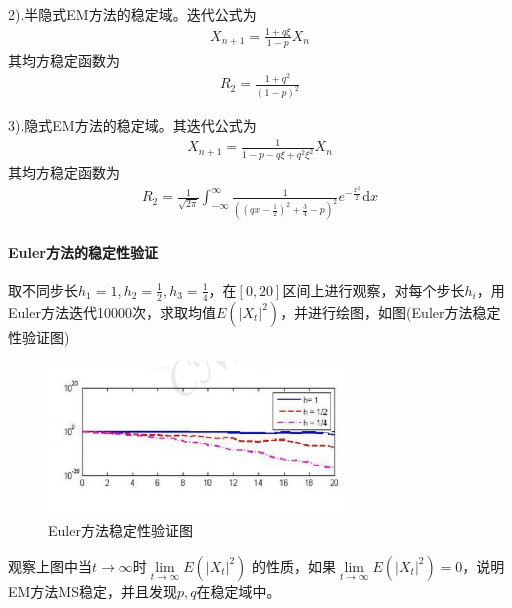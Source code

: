             \par
            2).半隐式EM方法的稳定域。迭代公式为
            \begin{align*}
            X_{n+1}=\frac{1+q\xi}{1-p}X_n
            \end{align*}
            其均方稳定函数为
            \begin{align*}
            R_2 = \frac{1+q^2}{(1-p)^2}
            \end{align*}
            \par
            3).隐式EM方法的稳定域。其迭代公式为
            \begin{align*}
            X_{n+1} = \frac{1}{1-p-q\xi + q^2 \xi^2} X_n
            \end{align*}
            其均方稳定函数为
            \begin{align*}
            R_2 = \frac{1}{\sqrt{2\pi}}\int_{- \infty}^{\infty}\frac{1}{( ( qx - \frac 12 )^2 +\frac {3}{4} - p )^2 } e^{-\frac{x^2}{2}}\mathrm{d}x
            \end{align*}

            \paragraph{Euler方法的稳定性验证}
            取不同步长$h_1 = 1,h_2 = \frac 12,h_3 = \frac 14$，在$[0,20]$区间上进行观察，对每个步长$h_i$，用Euler方法迭代10000次，求取均值$E(|X_t|^2)$，并进行绘图，如图(Euler方法稳定性验证图)
           \begin{figure}[H]
           \centering
           \includegraphics[width=8cm]{images/Euler_stable.png}
           \caption{Euler方法稳定性验证图}
           \label{fig:Euler方法稳定性验证图}
           \end{figure}
            观察上图中当$t\rightarrow \infty$时$\lim\limits_{t\rightarrow \infty}E(|X_t|^2)$
            的性质，如果$\lim\limits_{t\rightarrow \infty}E(|X_t|^2) = 0$，说明EM方法MS稳定，并且发现$p,q$在稳定域中。
